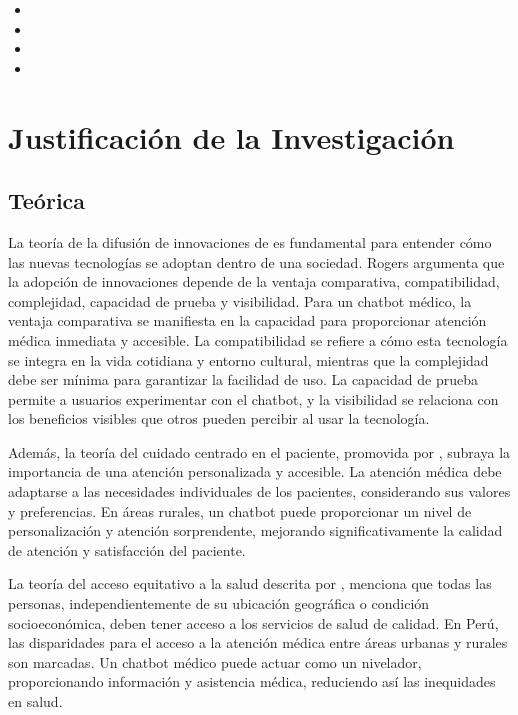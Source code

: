 \begin{itemize}
	\item {\Objone}
	\item {\Objtwo}
	\item {\Objthree}
	\item {\Objfour}
\end{itemize}

\section{Justificación de la Investigación}

\subsection{Teórica}
La teoría de la difusión de innovaciones de \cite{rogers2003} es fundamental para entender cómo las nuevas tecnologías se adoptan dentro de una sociedad. Rogers argumenta que la adopción de innovaciones depende de la ventaja comparativa, compatibilidad, complejidad, capacidad de prueba y visibilidad. Para un chatbot médico, la ventaja comparativa se manifiesta en la capacidad para proporcionar atención médica inmediata y accesible. La compatibilidad se refiere a cómo esta tecnología se integra en la vida cotidiana y entorno cultural, mientras que la complejidad debe ser mínima para garantizar la facilidad de uso. La capacidad de prueba permite a usuarios experimentar con el chatbot, y la visibilidad se relaciona con los beneficios visibles que otros pueden percibir al usar la tecnología.

Además, la teoría del cuidado centrado en el paciente, promovida por \cite{Epstein100}, subraya la importancia de una atención personalizada y accesible. La atención médica debe adaptarse a las necesidades individuales de los pacientes, considerando sus valores y preferencias. En áreas rurales, un chatbot puede proporcionar un nivel de personalización y atención sorprendente, mejorando significativamente la calidad de atención y satisfacción del paciente.

La teoría del acceso equitativo a la salud descrita por \cite{Braveman254}, menciona que todas las personas, independientemente de su ubicación geográfica o condición socioeconómica, deben tener acceso a los servicios de salud de calidad. En Perú, las disparidades para el acceso a la atención médica entre áreas urbanas y rurales son marcadas. Un chatbot médico puede actuar como un nivelador, proporcionando información y asistencia médica, reduciendo así las inequidades en salud.

